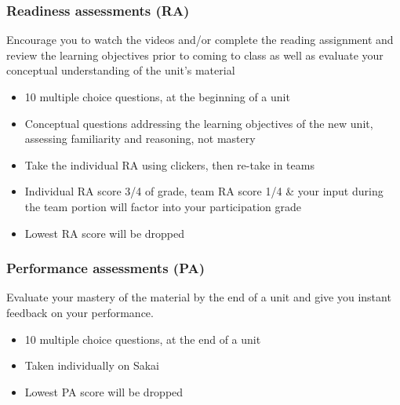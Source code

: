 \documentclass[11pt,containsverbatim,handout,xcolor=xelatex,dvipsnames,table]{beamer}
\begin{document}
\begin{frame}
\frametitle{Readiness assessments (RA)}

 Encourage you to watch the videos and/or complete the reading assignment and review the learning objectives prior to coming to class as well as evaluate your conceptual understanding of the unit's material

\begin{itemize}

\item 10 multiple choice questions, at the beginning of a unit

\item Conceptual questions addressing the learning objectives of the new unit, assessing familiarity and reasoning, not mastery

\item Take the individual RA using clickers, then re-take in teams

\item Individual RA score 3/4 of grade, team RA score 1/4 \& your input during the team portion will factor into your participation grade

\item Lowest RA score will be dropped

\end{itemize}

\end{frame}


\begin{frame}
\frametitle{Performance assessments (PA)}

 Evaluate your mastery of the material by the end of a unit and give you instant feedback on your performance.

\begin{itemize}

\item 10 multiple choice questions, at the end of a unit

\item Taken individually on Sakai

\item Lowest PA score will be dropped

\end{itemize}

\end{frame}

\end{document}
